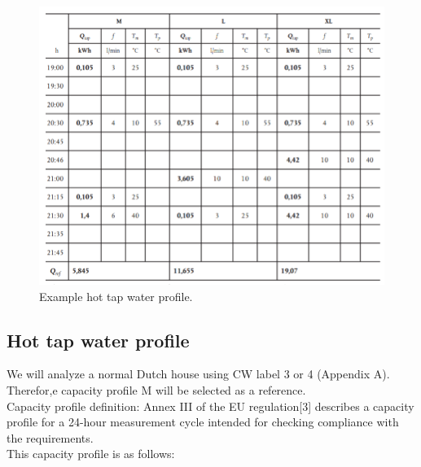 \begin{figure}[H]
\centering
\includegraphics[width=1\columnwidth]{pictures/hot tap water.png}
\caption[Short title]{Example hot tap water profile.}
\label{fig:htwp}
\end{figure}








\subsection{Hot tap water profile}
 
 
We will analyze a normal Dutch house using CW label 3 or 4 (Appendix A). Therefor,e capacity profile M will be selected as a reference.\\
Capacity profile definition:
Annex III of the EU regulation[3] describes a capacity profile for a 24-hour measurement cycle intended for checking compliance with the requirements.\\
This capacity profile is as follows:


